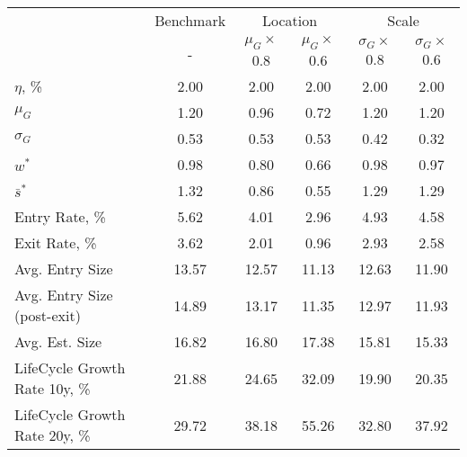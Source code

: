 \begin{tabular}{lccccc}
\toprule
{} & Benchmark & \multicolumn{2}{c}{Location} & \multicolumn{2}{c}{Scale} \\
{} &         - & $\mu_G\times$0.8 & $\mu_G\times$0.6 & $\sigma_G\times$0.8 & $\sigma_G\times$0.6 \\
\midrule
$\eta$, \%                    &      2.00 &             2.00 &             2.00 &                2.00 &                2.00 \\
$\mu_G$                       &      1.20 &             0.96 &             0.72 &                1.20 &                1.20 \\
$\sigma_G$                    &      0.53 &             0.53 &             0.53 &                0.42 &                0.32 \\
$w^*$                         &      0.98 &             0.80 &             0.66 &                0.98 &                0.97 \\
$\bar{s}^*$                   &      1.32 &             0.86 &             0.55 &                1.29 &                1.29 \\
Entry Rate, \%                &      5.62 &             4.01 &             2.96 &                4.93 &                4.58 \\
Exit Rate, \%                 &      3.62 &             2.01 &             0.96 &                2.93 &                2.58 \\
Avg. Entry Size               &     13.57 &            12.57 &            11.13 &               12.63 &               11.90 \\
Avg. Entry Size (post-exit)   &     14.89 &            13.17 &            11.35 &               12.97 &               11.93 \\
Avg. Est. Size                &     16.82 &            16.80 &            17.38 &               15.81 &               15.33 \\
LifeCycle Growth Rate 10y, \% &     21.88 &            24.65 &            32.09 &               19.90 &               20.35 \\
LifeCycle Growth Rate 20y, \% &     29.72 &            38.18 &            55.26 &               32.80 &               37.92 \\
\bottomrule
\end{tabular}
